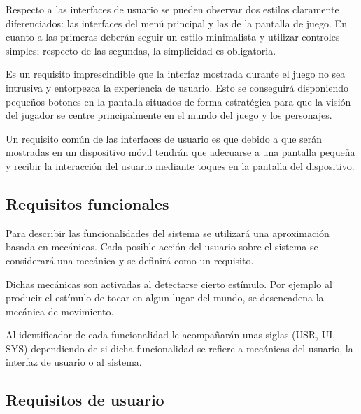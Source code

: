 Respecto a las interfaces de usuario se pueden observar dos estilos claramente diferenciados: las interfaces del menú principal y las de la pantalla de juego. En cuanto a las primeras deberán seguir un estilo minimalista y utilizar controles simples; respecto de las segundas, la simplicidad es obligatoria.

Es un requisito imprescindible que la interfaz mostrada durante el juego no sea intrusiva y entorpezca la experiencia de usuario. Esto se conseguirá disponiendo pequeños botones en la pantalla situados de forma estratégica para que la visión del jugador se centre principalmente en el mundo del juego y los personajes.

Un requisito común de las interfaces de usuario es que debido a que serán mostradas en un dispositivo móvil tendrán que adecuarse a una pantalla pequeña y recibir la interacción del usuario mediante toques en la pantalla del dispositivo.

\subsection{Requisitos funcionales}

Para describir las funcionalidades del sistema se utilizará una aproximación basada en mecánicas. Cada posible acción del usuario sobre el sistema se considerará una mecánica y se definirá como un requisito. 

Dichas mecánicas son activadas al detectarse cierto estímulo. Por ejemplo al producir el estímulo de tocar en algun lugar del mundo, se desencadena la mecánica de movimiento.

Al identificador de cada funcionalidad le acompañarán unas siglas (USR, UI, SYS) dependiendo de si dicha funcionalidad se refiere a mecánicas del usuario, la interfaz de usuario o al sistema.

\subsection{Requisitos de usuario}
\label{requisitosUsuario}

